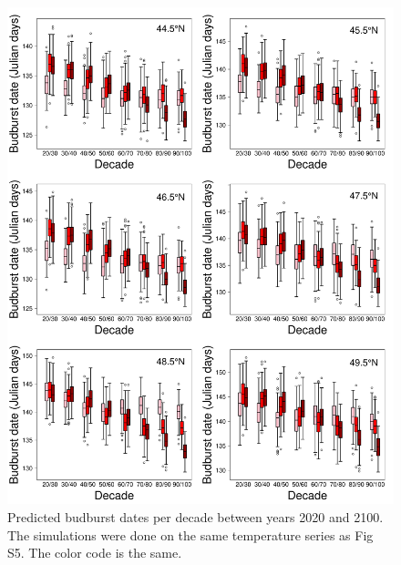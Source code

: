 \documentclass[12 pt]{article}
\begin{document}
\begin{figure}[ht]
\begin{center}
\renewcommand{\thefigure}{S\arabic{figure}}
\includegraphics[width = 14 cm, keepaspectratio]{Budburst_Per_Decade}
\caption{\doublespacing  Predicted budburst dates per decade between years 2020 and 2100. The simulations were done on the same temperature series as Fig S5. The color code is the same.}
\end{center}
\end{figure}
\end{document}
